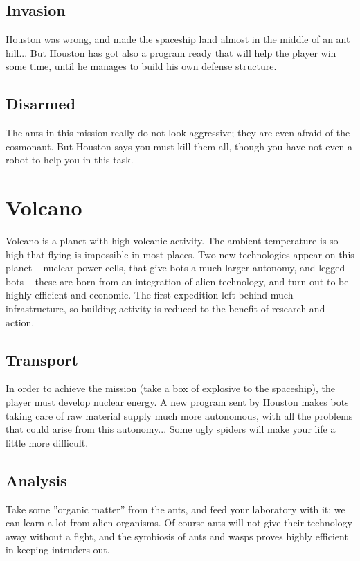 \subsection{Invasion}

Houston was wrong, and made the spaceship land almost in the middle of an ant hill... But Houston has got also a program ready that will help the player win some time, until he manages to build his own defense structure.


\subsection{Disarmed}

The ants in this mission really do not look aggressive; they are even afraid of the cosmonaut. But Houston says you must kill them all, though you have not even a robot to help you in this task.


\section{Volcano}

Volcano is a planet with high volcanic activity. The ambient temperature is so high that flying is impossible in most places. Two new technologies appear on this planet -- nuclear power cells, that give bots a much larger autonomy, and legged bots -- these are born from an integration of alien technology, and turn out to be highly efficient and economic. The first expedition left behind much infrastructure, so building activity is reduced to the benefit of research
and action.


\subsection{Transport}

In order to achieve the mission (take a box of explosive to the spaceship), the player must develop nuclear energy. A new program sent by Houston makes bots taking care of raw material supply much more autonomous, with all the problems that could arise from this autonomy... Some ugly spiders will make your life a little more difficult.


\subsection{Analysis}

Take some ''organic matter'' from the ants, and feed your laboratory with it: we can learn a lot from alien
organisms. Of course ants will not give their technology away without a fight, and the symbiosis of ants and
wasps proves highly efficient in keeping intruders out.


